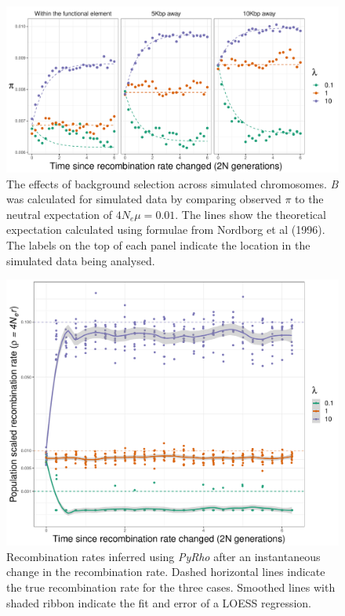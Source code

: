 \documentclass[11pt,twoside, onecolumn]{GSA_format}
\begin{document}
\begin{figure}[h]
\includegraphics[width=\textwidth]{../TheoreticalExpectation/B_over_time_fixed_s_plot.pdf}
\caption{The effects of background selection across simulated chromosomes. \textit{B} was calculated for simulated data by comparing observed $\pi$ to the neutral expectation of $4N_e\mu=0.01$. The lines show the theoretical expectation calculated using formulae from Nordborg et al (1996). The labels on the top of each panel indicate the location in the simulated data being analysed.}
\label{fig:BGS_over_time_multiPanel}
\end{figure}


\begin{figure}[h]
\includegraphics[width=\textwidth]{../TheoreticalExpectation/recRatesPlot.pdf}
\caption{Recombination rates inferred using \textit{PyRho} after an instantaneous change in the recombination rate. Dashed horizontal lines indicate the true recombination rate for the three cases. Smoothed lines with shaded ribbon indicate the fit and error of a LOESS regression.
}
\label{fig:recombinationRateEstimates}
\end{figure}
\end{document}
